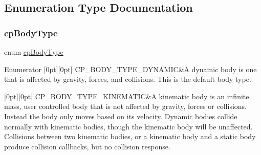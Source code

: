 \subsection{Enumeration Type Documentation}
\mbox{\label{group__cp_body_ga3581b128fd3e2734952aeac8545fd5ca}} 
\subsubsection{\texorpdfstring{cp\+Body\+Type}{cpBodyType}}
{\footnotesize\ttfamily enum \mbox{\hyperlink{group__cp_body_ga3581b128fd3e2734952aeac8545fd5ca}{cp\+Body\+Type}}}

\begin{DoxyEnumFields}{Enumerator}
[0pt][0pt]{}\mbox{\label{group__cp_body_gga3581b128fd3e2734952aeac8545fd5caa443c53c7b27e64799ee0eba728e60db6}} 
C\+P\+\_\+\+B\+O\+D\+Y\+\_\+\+T\+Y\+P\+E\+\_\+\+D\+Y\+N\+A\+M\+IC&A dynamic body is one that is affected by gravity, forces, and collisions. This is the default body type. \\
\hline

[0pt][0pt]{}\mbox{\label{group__cp_body_gga3581b128fd3e2734952aeac8545fd5caa95e6c8d1ff2714d17bc4f2258407e58d}} 
C\+P\+\_\+\+B\+O\+D\+Y\+\_\+\+T\+Y\+P\+E\+\_\+\+K\+I\+N\+E\+M\+A\+T\+IC&A kinematic body is an infinite mass, user controlled body that is not affected by gravity, forces or collisions. Instead the body only moves based on it\textquotesingle{}s velocity. Dynamic bodies collide normally with kinematic bodies, though the kinematic body will be unaffected. Collisions between two kinematic bodies, or a kinematic body and a static body produce collision callbacks, but no collision response. \\
\hline


\end{DoxyEnumFields}
